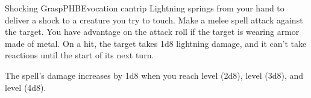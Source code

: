 \begin{spell}{Shocking Grasp}{PHB}{Evocation cantrip}
{
}
Lightning springs from your hand to deliver a shock to
a creature you try to touch. Make a melee spell attack
against the target. You have advantage on the attack roll
if the target is wearing armor made of metal. On a hit,
the target takes 1d8 lightning damage, and it can't take
reactions until the start of its next turn.

 The spell's damage increases by 1d8 when you reach
 level (2d8),  level (3d8), and  level (4d8).
\end{spell}
